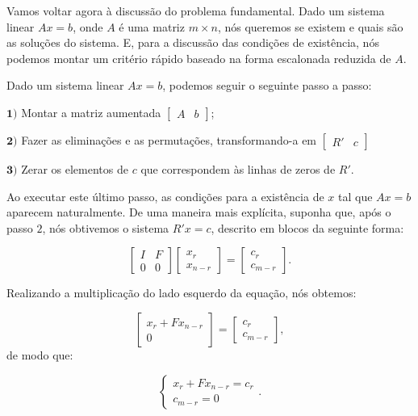 Vamos voltar agora à discussão do problema fundamental. Dado um sistema linear $Ax = b$, onde $A$ é uma matriz $m\times n$, nós queremos se existem e quais são as soluções do sistema. E, para a discussão das condições de existência, nós podemos montar um critério rápido baseado na forma escalonada reduzida de $A$.

Dado um sistema linear $Ax = b$, podemos seguir o seguinte passo a passo:

$\mathbf{1)}$ Montar a matriz aumentada $\begin{bmatrix}
	A & b
\end{bmatrix}$;

$\mathbf{2)}$ Fazer as eliminações e as permutações, transformando-a em $\begin{bmatrix}
	R' & c
\end{bmatrix}$

$\mathbf{3)}$ Zerar os elementos de $c$ que correspondem às linhas de zeros de $R'$.

Ao executar este último passo, as condições para a existência de $x$ tal que $Ax = b$ aparecem naturalmente. De uma maneira mais explícita, suponha que, após o passo $2$, nós obtivemos o sistema $R'x = c$, descrito em blocos da seguinte forma:

$$
\begin{bmatrix}
	I & F \\
	0 & 0
\end{bmatrix}
\begin{bmatrix}
	x_{r} \\
	x_{n - r}
\end{bmatrix}
=
\begin{bmatrix}
	c_{r} \\
	c_{m - r}
\end{bmatrix}.
$$

Realizando a multiplicação do lado esquerdo da equação, nós obtemos:

$$
\begin{bmatrix}
	x_{r} + Fx_{n - r} \\
	0
\end{bmatrix}
=
\begin{bmatrix}
	c_{r} \\
	c_{m - r}
\end{bmatrix},
$$
de modo que:

$$
\begin{cases}
	x_{r} + Fx_{n - r} = c_{r} \\
	c_{m - r} = 0
\end{cases}.
$$

